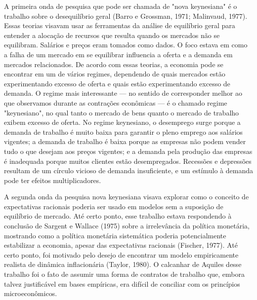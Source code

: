 \documentclass[12pt]{article}
\begin{document}
A primeira onda de pesquisa que pode ser chamada de "nova keynesiana" é o trabalho sobre o desequilíbrio geral (Barro e Grossman, 1971; Malinvaud, 1977). Essas teorias visavam usar as ferramentas da análise de equilíbrio geral para entender a alocação de recursos que resulta quando os mercados não se equilibram. Salários e preços eram tomados como dados. O foco estava em como a falha de um mercado em se equilibrar influencia a oferta e a demanda em mercados relacionados. De acordo com essas teorias, a economia pode se encontrar em um de vários regimes, dependendo de quais mercados estão experimentando excesso de oferta e quais estão experimentando excesso de demanda. O regime mais interessante — no sentido de corresponder melhor ao que observamos durante as contrações econômicas — é o chamado regime "keynesiano", no qual tanto o mercado de bens quanto o mercado de trabalho exibem excesso de oferta. No regime keynesiano, o desemprego surge porque a demanda de trabalho é muito baixa para garantir o pleno emprego aos salários vigentes; a demanda de trabalho é baixa porque as empresas não podem vender tudo o que desejam aos preços vigentes; e a demanda pela produção das empresas é inadequada porque muitos clientes estão desempregados. Recessões e depressões resultam de um círculo vicioso de demanda insuficiente, e um estímulo à demanda pode ter efeitos multiplicadores.

A segunda onda da pesquisa nova keynesiana visava explorar como o conceito de expectativas racionais poderia ser usado em modelos sem a suposição de equilíbrio de mercado. Até certo ponto, esse trabalho estava respondendo à conclusão de Sargent e Wallace (1975) sobre a irrelevância da política monetária, mostrando como a política monetária sistemática poderia potencialmente estabilizar a economia, apesar das expectativas racionais (Fischer, 1977). Até certo ponto, foi motivado pelo desejo de encontrar um modelo empiricamente realista de dinâmica inflacionária (Taylor, 1980). O calcanhar de Aquiles desse trabalho foi o fato de assumir uma forma de contratos de trabalho que, embora talvez justificável em bases empíricas, era difícil de conciliar com os princípios microeconômicos.
\end{document}
